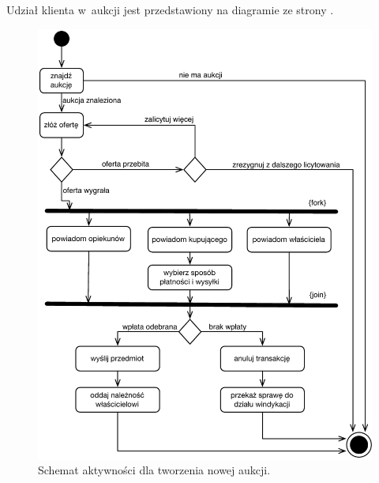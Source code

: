 \documentclass[10pt,a4paper]{article}
\begin{document}
Udział klienta w~aukcji jest przedstawiony na diagramie
ze strony \pageref{fig:aktywnosc_udzial_w_aukcji}.

\newpage
\begin{figure}[p]
  \begin{adjustwidth}{-3cm}{-3cm}
    \centering
    \includegraphics{figury/aktywnosc-udzial-w-aukcji}
    \caption{Schemat aktywności dla tworzenia nowej aukcji.}
    \label{fig:aktywnosc_udzial_w_aukcji}
  \end{adjustwidth}
\end{figure}
\clearpage
\end{document}

